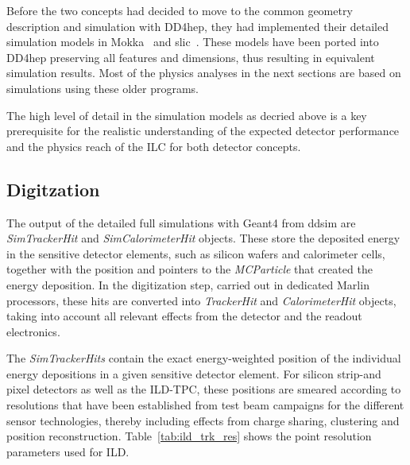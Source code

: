 Before the two concepts had decided to move to the common geometry description and simulation with DD4hep, they had
implemented their detailed simulation models in Mokka~\cite{MoradeFreitas:2002kj} and slic~\cite{bib:slic}. These models
have been ported into DD4hep preserving all features and dimensions, thus resulting in equivalent simulation results.
Most of the physics analyses in the next sections are based on simulations using these older programs.

The high level of detail in the simulation models as decried above is a key prerequisite for the
realistic understanding of the expected detector performance and the physics reach of the ILC for both detector concepts.


\subsection{\label{sub:sw-digi}Digitzation}

The output of the detailed full simulations with Geant4 from 
ddsim are \emph{SimTrackerHit} and \emph{SimCalorimeterHit} objects.
These store the deposited energy in the sensitive detector elements, such as silicon wafers and calorimeter cells, together with
the position and pointers to the \emph{MCParticle} that created the energy deposition. In the digitization step, carried out in dedicated
Marlin processors, these hits are converted into \emph{TrackerHit} and \emph{CalorimeterHit} objects,
taking into account all relevant effects from the detector and the readout electronics.

The \emph{SimTrackerHits} contain the exact energy-weighted position of the individual energy depositions in a given sensitive
detector element. For silicon strip-and pixel detectors as well as the ILD-TPC, these positions are smeared according to
resolutions that have been established from test beam campaigns for the different sensor technologies, thereby including effects
from charge sharing, clustering and position reconstruction. Table~\ref{tab:ild_trk_res} shows the point resolution parameters used for ILD.




